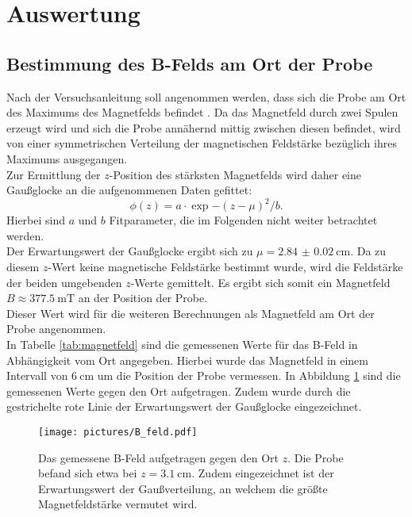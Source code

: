 \section{Auswertung}
\label{sec:Auswertung}
%
\subsection{Bestimmung des B-Felds am Ort der Probe}
Nach der Versuchsanleitung soll angenommen werden, dass sich die Probe am Ort des Maximums des Magnetfelds befindet \cite{Anleitung}.
Da das Magnetfeld durch zwei Spulen erzeugt wird und sich die Probe annähernd mittig zwischen diesen befindet, wird von einer symmetrischen Verteilung der magnetischen Feldstärke bezüglich ihres Maximums ausgegangen.\\ Zur Ermittlung der $z$-Position des stärksten Magnetfelds wird daher eine Gaußglocke an die aufgenommenen Daten gefittet:
\begin{equation}
  \phi(z)=a\cdot\exp{-(z-\mu)^2/b}\mathrm{.}
\end{equation}
Hierbei sind $a$ und $b$ Fitparameter, die im Folgenden nicht weiter betrachtet werden.\\
Der Erwartungswert der Gaußglocke ergibt sich zu $\mu=\SI{2.84(2)}{\centi\meter}$. Da zu diesem $z$-Wert keine magnetische Feldstärke bestimmt wurde, wird die Feldstärke der beiden umgebenden $z$-Werte gemittelt.
Es ergibt sich somit ein Magnetfeld $B\approx \SI{377.5}{\milli\tesla}$ an der Position der Probe.\\
Dieser Wert wird für die weiteren Berechnungen als Magnetfeld am Ort der Probe angenommen.\\
In Tabelle \ref{tab:magnetfeld} sind die gemessenen Werte für das B-Feld in Abhängigkeit vom Ort angegeben. Hierbei wurde das Magnetfeld in einem Intervall von $\SI{6}{\centi\meter}$ um die Position der Probe vermessen. In Abbildung \ref{fig:magnetfeld} sind die gemessenen Werte gegen den Ort aufgetragen. Zudem wurde durch die gestrichelte rote Linie der Erwartungswert der Gaußglocke eingezeichnet.
\begin{figure}
  \centering
  \texttt{[image: pictures/B\_feld.pdf]}
  \caption{Das gemessene B-Feld aufgetragen gegen den Ort $z$. Die Probe befand sich etwa bei $z=\SI{3.1}{\centi\meter}$. Zudem eingezeichnet ist der Erwartungswert der Gaußverteilung, an welchem die größte Magnetfeldstärke vermutet wird.}
  \label{fig:magnetfeld}
\end{figure}

\FloatBarrier
